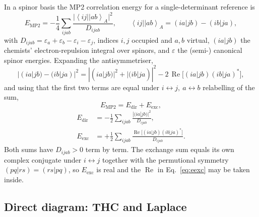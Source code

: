 \documentclass[aip,jcp,amsmath,amssymb,preprint,superscriptaddress]{revtex4-2}%
\newcommand{\ket}[1]{\left|#1\right\rangle}
\newcommand{\bra}[1]{\left\langle#1\right|}
\newcommand{\Edir}{E_{\mathrm{dir}}}
\newcommand{\Eexc}{E_{\mathrm{exc}}}
\newcommand{\Emp}{E_{\mathrm{MP2}}}
\newcommand{\re}{\operatorname{Re}}
\begin{document}
In a spinor basis the MP2 correlation energy for a single-determinant
reference is
\begin{equation}
  \Emp = -\frac14 \sum_{ijab}
         \frac{\bigl|\bra{ij}\!\ket{ab}_{\!A}\bigr|^{2}}{D_{ijab}},
  \qquad
  \bra{ij}\!\ket{ab}_{\!A} = (ia|jb)-(ib|ja),
  \label{eq:emp2}
\end{equation}
with $D_{ijab}=\varepsilon_a+\varepsilon_b-\varepsilon_i-\varepsilon_j$,
indices $i,j$ occupied and $a,b$ virtual, $(ia|jb)$ the chemists'
electron-repulsion integral over spinors, and $\varepsilon$ the (semi-)
canonical spinor energies. Expanding the antisymmetriser,
\begin{equation}
  \bigl|(ia|jb)-(ib|ja)\bigr|^{2}
   = |(ia|jb)|^2 + |(ib|ja)|^2
     - 2\,\re\!\bigl[(ia|jb)(ib|ja)^{*}\bigr],
\end{equation}
and using that the first two terms are equal under
$i\!\leftrightarrow\!j,\ a\!\leftrightarrow\!b$ relabelling of the sum,
\begin{equation}
  \Emp = \Edir + \Eexc,
  \label{eq:split}
\end{equation}
\begin{align}
  \Edir &= -\frac12 \sum_{ijab} \frac{|(ia|jb)|^{2}}{D_{ijab}},
  \label{eq:edir}\\[2pt]
  \Eexc &= +\frac12 \sum_{ijab}
           \frac{\re\!\bigl[(ia|jb)(ib|ja)^{*}\bigr]}{D_{ijab}} .
  \label{eq:eexc}
\end{align}
Both sums have $D_{ijab}>0$ term by term. The exchange sum equals its own
complex conjugate under $i\!\leftrightarrow\!j$ together with the permutional
symmetry $(pq|rs)=(rs|pq)$, so $\Eexc$ is real and the $\re$ in
Eq.~\eqref{eq:eexc} may be taken inside.

\subsection{Direct diagram: THC and Laplace}
\end{document}
